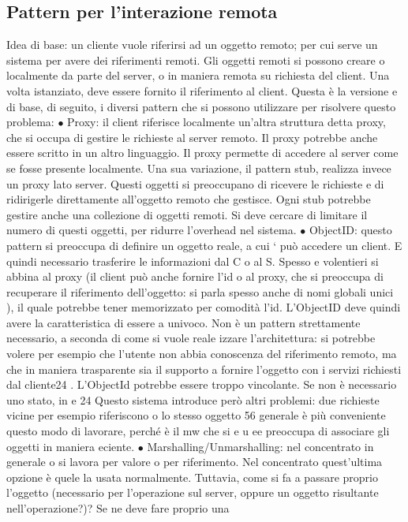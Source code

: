 \subsection{Pattern per l'interazione remota}
Idea di base: un cliente vuole riferirsi ad un oggetto remoto; per cui serve un
sistema per avere dei riferimenti remoti. Gli oggetti remoti si possono creare o
localmente da parte del server, o in maniera remota su richiesta del client. Una
volta istanziato, deve essere fornito il riferimento al client. Questa è la versione
e
di base, di seguito, i diversi pattern che si possono utilizzare per risolvere questo
problema:
$\bullet$ Proxy: il client riferisce localmente un'altra struttura detta proxy, che si
occupa di gestire le richieste al server remoto. Il proxy potrebbe anche
essere scritto in un altro linguaggio. Il proxy permette di accedere al server
come se fosse presente localmente.
Una sua variazione, il pattern stub, realizza invece un proxy lato server.
Questi oggetti si preoccupano di ricevere le richieste e di ridirigerle direttamente all'oggetto remoto che gestisce.
Ogni stub potrebbe gestire anche
una collezione di oggetti remoti.
Si deve cercare di limitare il numero di questi oggetti, per ridurre l'overhead nel sistema.
$\bullet$ ObjectID: questo pattern si preoccupa di definire un oggetto reale, a cui
`
può accedere un client. E quindi necessario trasferire le informazioni dal C
o
al S. Spesso e volentieri si abbina al proxy (il client può anche fornire l'id
o
al proxy, che si preoccupa di recuperare il riferimento dell'oggetto: si parla
spesso anche di nomi globali unici ), il quale potrebbe tener memorizzato
per comodità l'id. L'ObjectID deve quindi avere la caratteristica di essere
a
univoco.
Non è un pattern strettamente necessario, a seconda di come si vuole reale
izzare l'architettura: si potrebbe volere per esempio che l'utente non abbia
conoscenza del riferimento remoto, ma che in maniera trasparente sia il
supporto a fornire l'oggetto con i servizi richiesti dal cliente24 . L'ObjectId potrebbe essere troppo vincolante. Se
non è necessario uno stato, in
e
24 Questo sistema introduce però altri problemi: due richieste vicine per esempio riferiscono
o
lo stesso oggetto
56
generale è più conveniente questo modo di lavorare, perché è il mw che si
e u
ee
preoccupa di associare gli oggetti in maniera eciente.
$\bullet$ Marshalling/Unmarshalling: nel concentrato in generale o si lavora per
valore o per riferimento. Nel concentrato quest'ultima opzione è quele
la usata normalmente. Tuttavia, come si fa a passare proprio l'oggetto
(necessario per l'operazione sul server, oppure un oggetto risultante nell'operazione?)? Se ne deve fare proprio una
